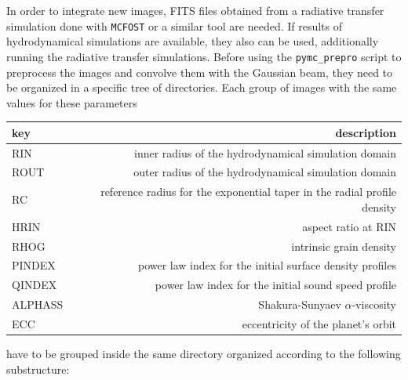 \documentclass[a4paper,10pt]{report}
\begin{document}
In order to integrate new images, FITS files obtained from a radiative 
transfer simulation done with \lstinline{MCFOST} or a similar tool are needed. If results of hydrodynamical 
simulations are available, they also can be used, additionally running the radiative transfer simulations.
Before using the \lstinline{pymc_prepro} script to preprocess the images and convolve them with the Gaussian beam,
they need to be organized in a specific tree of directories.
Each group of images with the same values for these parameters

\begin{center}
    \begin{tabular}{lr}
        \toprule
        key & description \\
        \midrule
        RIN & inner radius of the hydrodynamical simulation domain \\
        ROUT & outer radius of the hydrodynamical simulation domain\\
        RC & reference radius for the exponential taper in the radial profile density\\ 
        HRIN & aspect ratio at RIN \\ 
        RHOG & intrinsic grain density\\ 
        PINDEX & power law index for the initial surface density profiles\\
        QINDEX & power law index for the initial sound speed profile \\
        ALPHASS & Shakura-Sunyaev $\alpha$-viscosity\\
        ECC & eccentricity of the planet's orbit\\
        \bottomrule        
    \end{tabular}
\end{center}

have to be grouped inside the same directory organized according to the following substructure:

\end{document}
